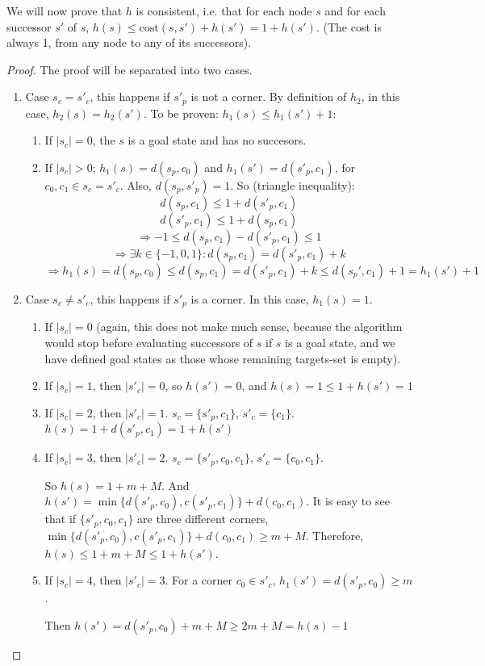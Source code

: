 \documentclass{article}
\begin{document}
We will now prove that $h$ is consistent, i.e. that for each node $s$ and for each successor $s'$ of $s$, $h(s) \leq \text{cost}(s,s') + h(s') = 1 + h(s')$. (The cost is always 1, from any node to any of its successors).
\bigskip
\begin{tcolorbox}
\begin{proof}

    The proof will be separated into two cases.

    \begin{enumerate}
        \item Case $s_c = s'_c$, this happens if $s'_p$ is not a corner. By definition of $h_2$, in this case, $h_2(s)=h_2(s')$. To be proven: $h_1(s) \leq h_1(s')+1$:
        \begin{enumerate}
            \item If $|s_c| = 0$, the $s$ is a goal state and has no succesors.
            \item If $|s_c|>0$; $h_1(s)=d(s_p,c_0)$ and $h_1(s')=d(s'_p,c_1)$, for $c_0,c_1\in s_c=s'_c$.
            Also, $d(s_p,s'_p)=1$. So (triangle inequality): 
                $$d(s_p,c_1)\leq 1+d(s'_p,c_1)$$
                $$d(s'_p,c_1)\leq 1+d(s_p,c_1)$$
                $$\Rightarrow -1\leq d(s_p,c_1)-d(s'_p,c_1)\leq 1$$
                $$\Rightarrow \exists k\in \{-1,0,1\}:d(s_p,c_1)=d(s'_p,c_1)+k$$
                $$\Rightarrow h_1(s)= d(s_p,c_0)\leq d(s_p,c_1) = d(s'_p,c_1)+k\leq d(s_p',c_1)+1 = h_1(s')+1$$
        \end{enumerate}
        \item Case $s_c \neq s'_c$, this happens if $s'_p$ is a corner. In this case, $h_1(s) = 1$.
        \begin{enumerate}
            \item If $|s_c|=0$ (again, this does not make much sense, because the algorithm would stop before evaluating successors of $s$ if $s$ is a goal state, and we have defined goal states as those whose remaining targets-set is empty).
            \item If $|s_c|=1$, then $|s'_c|=0$, so $h(s')=0$, and $h(s)=1\leq 1+h(s')=1$
            \item If $|s_c|=2$, then $|s'_c|=1$. $s_c=\{s'_p,c_1\}$, $s'_c=\{c_1\}$. $h(s)=1+d(s'_p,c_1)=1+h(s')$
            \item If $|s_c|=3$, then $|s'_c|=2$. $s_c=\{s'_p,c_0,c_1\}$, $s'_c = \{c_0, c_1\}$. 
            
            So $h(s)=1+m+M$. And $h(s') =\min \{d(s'_p,c_0),c(s'_p,c_1)\} + d(c_0,c_1)$. It is easy to see that if $\{s'_p,c_0,c_1\}$ are three different corners, $\min \{d(s'_p,c_0),c(s'_p,c_1)\} + d(c_0,c_1) \geq m+M$. Therefore, $h(s)\leq 1+m+M\leq 1+h(s')$.
            \item If $|s_c|=4$, then $|s'_c|=3$. For a corner $c_0\in s'_c$, $h_1(s')=d(s'_p,c_0)\geq m$. 
            
            Then $h(s')=d(s'_p,c_0)+m+M\geq 2m + M = h(s) - 1$
        \end{enumerate}
    \end{enumerate}
\end{proof}
\end{tcolorbox}
\end{document}
